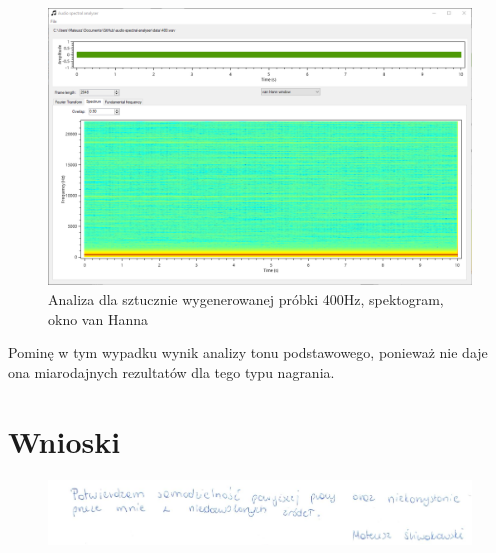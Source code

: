 \documentclass{article}
\begin{document}
\begin{figure}[H]
\includegraphics[width=6in]{scr6.png}
\centering
\caption{Analiza dla sztucznie wygenerowanej próbki 400Hz, spektogram, okno van Hanna}
\label{fig:interface}
\end{figure}

Pominę w tym wypadku wynik analizy tonu podstawowego, ponieważ nie daje ona miarodajnych rezultatów dla tego typu nagrania.

\section{Wnioski}

\begin{figure}[b]
\centering
\includegraphics[width=5in]{bottom.png}
\end{figure}
\end{document}
